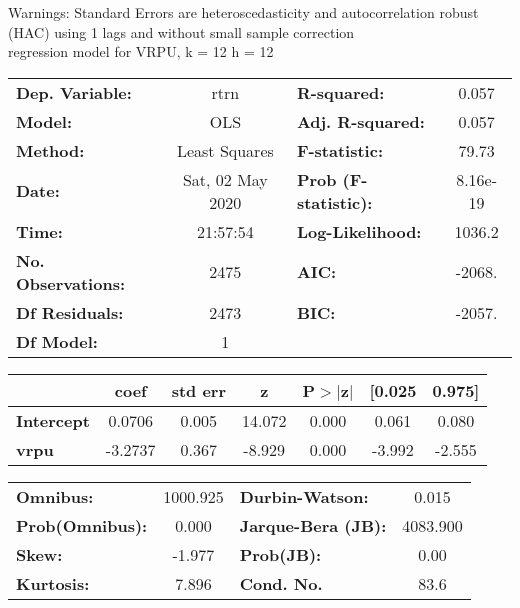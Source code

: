Warnings: \newline
 [1] Standard Errors are heteroscedasticity and autocorrelation robust (HAC) using 1 lags and without small sample correction\\ 

regression model for VRPU, k = 12 h = 12\begin{center}
\begin{tabular}{lclc}
\toprule
\textbf{Dep. Variable:}    &       rtrn       & \textbf{  R-squared:         } &     0.057   \\
\textbf{Model:}            &       OLS        & \textbf{  Adj. R-squared:    } &     0.057   \\
\textbf{Method:}           &  Least Squares   & \textbf{  F-statistic:       } &     79.73   \\
\textbf{Date:}             & Sat, 02 May 2020 & \textbf{  Prob (F-statistic):} &  8.16e-19   \\
\textbf{Time:}             &     21:57:54     & \textbf{  Log-Likelihood:    } &    1036.2   \\
\textbf{No. Observations:} &        2475      & \textbf{  AIC:               } &    -2068.   \\
\textbf{Df Residuals:}     &        2473      & \textbf{  BIC:               } &    -2057.   \\
\textbf{Df Model:}         &           1      & \textbf{                     } &             \\
\bottomrule
\end{tabular}
\begin{tabular}{lcccccc}
                   & \textbf{coef} & \textbf{std err} & \textbf{z} & \textbf{P$> |$z$|$} & \textbf{[0.025} & \textbf{0.975]}  \\
\midrule
\textbf{Intercept} &       0.0706  &        0.005     &    14.072  &         0.000        &        0.061    &        0.080     \\
\textbf{vrpu}      &      -3.2737  &        0.367     &    -8.929  &         0.000        &       -3.992    &       -2.555     \\
\bottomrule
\end{tabular}
\begin{tabular}{lclc}
\textbf{Omnibus:}       & 1000.925 & \textbf{  Durbin-Watson:     } &    0.015  \\
\textbf{Prob(Omnibus):} &   0.000  & \textbf{  Jarque-Bera (JB):  } & 4083.900  \\
\textbf{Skew:}          &  -1.977  & \textbf{  Prob(JB):          } &     0.00  \\
\textbf{Kurtosis:}      &   7.896  & \textbf{  Cond. No.          } &     83.6  \\
\bottomrule
\end{tabular}
\end{center}

